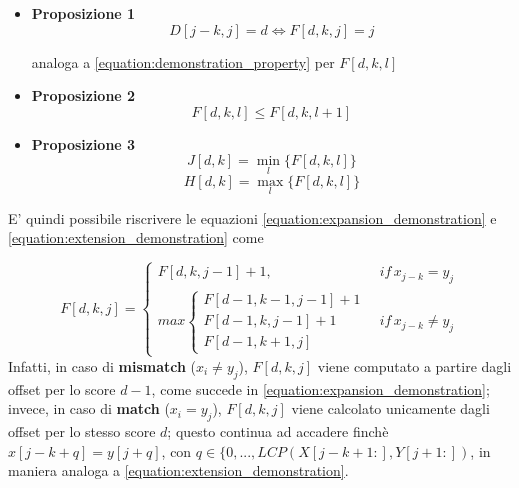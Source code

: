     \begin{itemize}
        \item \textbf{Proposizione 1}
        \begin{equation}
            D[j-k, j] = d \iff F[d, k, j] = j
            \label{equation:demonstration_property_1}
        \end{equation}
         
        analoga a \ref{equation:demonstration_property} per $F[d,k,l]$
        
        \item \textbf{Proposizione 2}
        $$F[d, k, l] \leq F[d, k, l + 1]$$
        
        \item \textbf{Proposizione 3}
        $$J[d, k] = \min_l \{ F[d, k, l] \}$$
        $$H[d, k] = \max_l \{ F[d, k, l] \}$$
    \end{itemize}
    E' quindi possibile riscrivere le equazioni \ref{equation:expansion_demonstration} e \ref{equation:extension_demonstration} come
    
    \begin{equation}
        F[d,k,j] = \begin{cases}
             F[d,k,j-1] + 1, & \, if \, x_{j - k} = y_{j} \\
             max \begin{cases}
                F[d-1, k-1, j-1] + 1 \\
                F[d-1, k, j-1] + 1 \\
                F[d-1, k+1, j]
            \end{cases} & \, if \, x_{j - k} \neq y_{j}
        \end{cases}
    \end{equation}
    Infatti, in caso di \textbf{mismatch} ($x_i \neq y_j$), $F[d,k,j]$ viene computato a partire dagli offset per lo score $d-1$, come succede in \ref{equation:expansion_demonstration}; invece, in caso di \textbf{match} ($x_i = y_j$), $F[d,k,j]$ viene calcolato unicamente dagli offset per lo stesso score $d$; questo continua ad accadere finchè $x[j - k + q] = y[j + q]$, con $q \in \{0, ..., LCP(X[j - k + 1:], Y[j + 1:])$, in maniera analoga a \ref{equation:extension_demonstration}.
    
